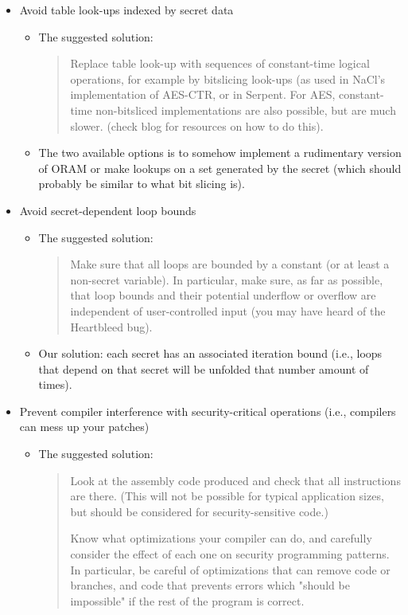 \begin{itemize}
\begin{itemize}
\end{itemize}
\item Avoid table look-ups indexed by secret data
\begin{itemize}
\item The suggested solution: 
\begin{quote}
Replace table look-up with sequences of constant-time logical operations, for example by bitslicing look-ups (as used in NaCl's implementation of AES-CTR, or in Serpent. For AES, constant-time non-bitsliced implementations are also possible, but are much slower. (check blog for resources on how to do this).
\end{quote}
\item The two available options is to somehow implement a rudimentary version of ORAM or make lookups on a set generated by the secret (which should probably be similar to what bit slicing is).
\end{itemize}
\item Avoid secret-dependent loop bounds
\begin{itemize}
\item The suggested solution: 
\begin{quote}
Make sure that all loops are bounded by a constant (or at least a non-secret variable). In particular, make sure, as far as possible, that loop bounds and their potential underflow or overflow are independent of user-controlled input (you may have heard of the Heartbleed bug).
\end{quote}
\item Our solution: each secret has an associated iteration bound (i.e., loops that depend on that secret will be unfolded that number amount of times).
\end{itemize}
\item Prevent compiler interference with security-critical operations (i.e., compilers can mess up your patches)
\begin{itemize}

\item The suggested solution: 
\begin{quote}
Look at the assembly code produced and check that all instructions are there. (This will not be possible for typical application sizes, but should be considered for security-sensitive code.)

Know what optimizations your compiler can do, and carefully consider the effect of each one on security programming patterns. In particular, be careful of optimizations that can remove code or branches, and code that prevents errors which "should be impossible" if the rest of the program is correct.


\end{quote}
\end{itemize}
\end{itemize}

